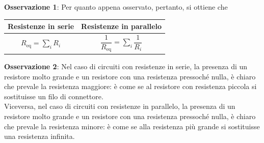\documentclass[a4paper]{extarticle}
\begin{document}
\vspace{1em}
\noindent
\textbf{Osservazione 1}: Per quanto appena osservato, pertanto, si ottiene che

\vspace{1em}
\noindent
\begin{table}[H]
  \centering
  \begin{tabular}{|c|c|}
    \hline
    Resistenze in serie & Resistenze in parallelo\\
    \hline
    $\displaystyle{R_\text{eq} = \sum_i R_i}$ & $\displaystyle{\dfrac{1}{R_\text{eq}} = \sum_i \dfrac{1}{R_i}}$\\
    \hline
\end{tabular}
\end{table}

\vspace{2em}
\noindent
\textbf{Osservazione 2}: Nel caso di circuiti con resistenze in serie, la presenza di un resistore molto grande e un resistore con una resistenza pressoché nulla, è chiaro che prevale la resistenza maggiore: è come se al resistore con resistenza piccola si sostituisse un filo di connettore.\\
Viceversa, nel caso di circuiti con resistenze in parallelo, la presenza di un resistore molto grande e un resistore con una resistenza pressoché nulla, è chiaro che prevale la resistenza minore: è come se alla resistenza più grande si sostituisse una resistenza infinita.\\
\end{document}
